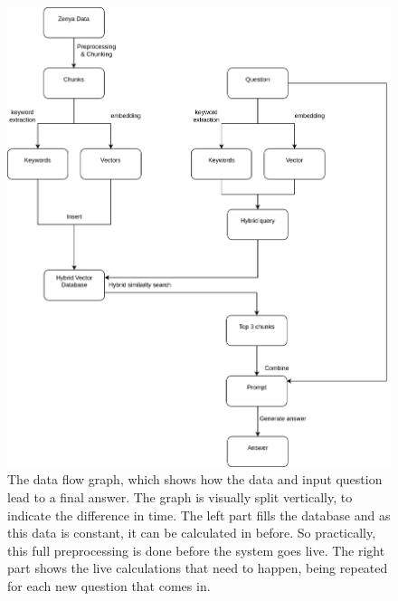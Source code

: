 \begin{figure}[H]
    \centerline{\includegraphics[width=1\linewidth]{fig/dataflow_graph.png}}
    \caption{The data flow graph, which shows how the data and input question lead to a final answer. The graph is visually split vertically, to indicate the difference in time. The left part fills the database and as this data is constant, it can be calculated in before. So practically, this full preprocessing is done before the system goes live. The right part shows the live calculations that need to happen, being repeated for each new question that comes in.}
    \label{fig:dataflow_graph}
\end{figure}

